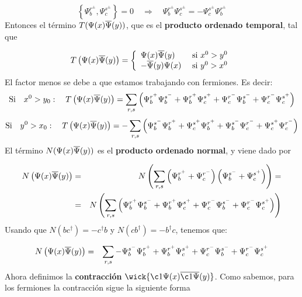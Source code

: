 \begin{solucion}
	\begin{equation*}
		\left\lbrace \Psi_b^{r^\pm}, \Psi_c^{s^\pm}\right\rbrace = 0 \quad \Rightarrow \quad  \Psi_b^{r^\pm}\Psi_c^{s^\pm} =- \Psi_c^{s^\pm}\Psi_b^{r^\pm}
	\end{equation*}	Entonces el término $T(\Psi(x)\overline{\Psi}(y))$, que es el \textbf{producto ordenado temporal}, tal que
	
	\begin{equation*}
		T\left( \Psi(x)\overline{\Psi}(y) \right) = \left\lbrace \begin{array}{ll}
			\Psi (x) \overline{\Psi} (y) & \ \text{si} \ x^0>y^0 \\
			-\overline{\Psi} (y) \Psi (x) & \ \text{si} \ y^0>x^0 \\
		\end{array} \right.
	\end{equation*}
	El factor menos se debe a que estamos trabajando con fermiones.	Es decir:
	\begin{equation*}
		\text{Si} \quad x^0 > y_0: \quad	T\left( \Psi(x)\overline{\Psi}(y) \right) = \sum_{r,s}\left(  \Psi_b^{r^+} \Psi_b^{s^-} +  \Psi_b^{r^+}\Psi_c^{s^+} + \Psi_c^{r^-} \Psi_b^{s^-} + \Psi_c^{r^-}\Psi_c^{s^+} \right)
	\end{equation*}
	\begin{equation*}
		\text{Si} \quad y^0 > x_0: \quad 	T\left( \Psi(x)\overline{\Psi}(y) \right) = - \sum_{r,s}\left(  \Psi_b^{s^-} \Psi_b^{r^+} +  \Psi_c^{s^+}\Psi_b^{r^+} + \Psi_b^{s^-} \Psi_c^{r^-} + \Psi_c^{s^+}\Psi_c^{r^-} \right)
	\end{equation*}
	El término $N(\Psi(x)\overline{\Psi}(y))$ es el \textbf{producto ordenado normal}, y viene dado por 
	
	\begin{eqnarray*}
		N\left( \Psi(x)\overline{\Psi}(y) \right) & =  & 
		N\left( \sum_{r,s}\left(  \Psi_b^{r^+} + \Psi_c^{r^-} \right)\left( \Psi_b^{s^-}+\Psi_c^{s^+} \right)  \right) = \\
		& = & N\left( \sum_{r,s} \left(  \Psi_b^{r^+} \Psi_b^{s^-} +  \Psi_b^{r^+}\Psi_c^{s^+} + \Psi_c^{r^-} \Psi_b^{s^-} + \Psi_c^{r^-}\Psi_c^{s^+} \right) \right)
	\end{eqnarray*}
	Usando que $N(bc^\dagger)=-c^\dagger b$ y $N(cb^\dagger)=-b^\dagger c$, tenemos que:
	
	\begin{eqnarray*}
		N\left( \Psi(x)\overline{\Psi}(y) \right) & = & \sum_{r,s} - \Psi_b^{s^-} \Psi_b^{r^+}  +  \Psi_b^{r^+}\Psi_c^{s^+} + \Psi_c^{r^-} \Psi_b^{s^-} + \Psi_c^{r^-}\Psi_c^{s^+}
	\end{eqnarray*}
	Ahora definimos la \textbf{contracción} $\wick{\c1{\Psi}(x)\overline{\c1{\Psi}}(y)}$. Como sabemos, para los fermiones la contracción sigue la siguiente forma
	

\end{solucion}
